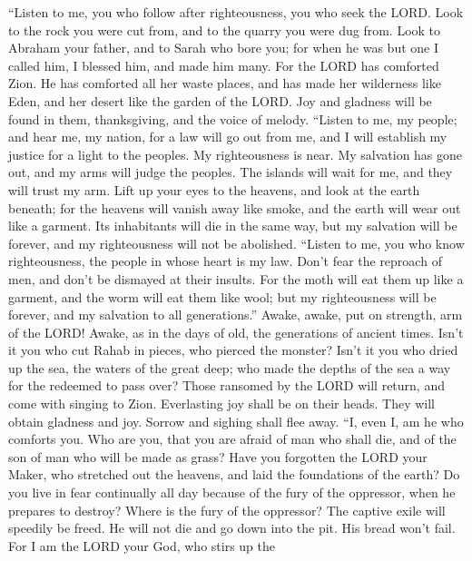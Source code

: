  ``Listen to me, you who follow after righteousness, you who
seek the LORD. Look to the rock you were cut from, and to the quarry you
were dug from.  Look to Abraham your father, and to Sarah
who bore you; for when he was but one I called him, I blessed him, and
made him many.  For the LORD has comforted Zion. He has
comforted all her waste places, and has made her wilderness like Eden,
and her desert like the garden of the LORD. Joy and gladness will be
found in them, thanksgiving, and the voice of melody. 
``Listen to me, my people; and hear me, my nation, for a law will go out
from me, and I will establish my justice for a light to the peoples.
 My righteousness is near. My salvation has gone out, and my
arms will judge the peoples. The islands will wait for me, and they will
trust my arm.  Lift up your eyes to the heavens, and look at
the earth beneath; for the heavens will vanish away like smoke, and the
earth will wear out like a garment. Its inhabitants will die in the same
way, but my salvation will be forever, and my righteousness will not be
abolished.  ``Listen to me, you who know righteousness, the
people in whose heart is my law. Don't fear the reproach of men, and
don't be dismayed at their insults.  For the moth will eat
them up like a garment, and the worm will eat them like wool; but my
righteousness will be forever, and my salvation to all generations.''
 Awake, awake, put on strength, arm of the LORD! Awake, as
in the days of old, the generations of ancient times. Isn't it you who
cut Rahab in pieces, who pierced the monster?  Isn't it you
who dried up the sea, the waters of the great deep; who made the depths
of the sea a way for the redeemed to pass over?  Those
ransomed by the LORD will return, and come with singing to Zion.
Everlasting joy shall be on their heads. They will obtain gladness and
joy. Sorrow and sighing shall flee away.  ``I, even I, am
he who comforts you. Who are you, that you are afraid of man who shall
die, and of the son of man who will be made as grass?  Have
you forgotten the LORD your Maker, who stretched out the heavens, and
laid the foundations of the earth? Do you live in fear continually all
day because of the fury of the oppressor, when he prepares to destroy?
Where is the fury of the oppressor?  The captive exile will
speedily be freed. He will not die and go down into the pit. His bread
won't fail.  For I am the LORD your God, who stirs up the
